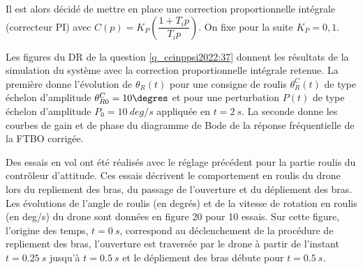 \ifprof
\begin{corrige}
\end{corrige}
\else
\fi

\ifprof
\begin{corrige}
\end{corrige}
\else
\fi

Il est alors décidé de mettre en place une correction proportionnelle intégrale (correcteur PI)
avec $C(p) = K_P\left(\dfrac{1+T_i p}{T_i p}\right)$. On fixe pour la suite $K_P = 0,1$.

\ifprof
\begin{corrige}
\end{corrige}
\else
\fi

Les figures du DR de la question \ref{q_ccinppsi2022:37} donnent les résultats de la simulation du système avec la
correction proportionnelle intégrale retenue. La première donne l’évolution de $\theta_R(t)$ pour une
consigne de roulis $\theta_R^C(t)$ de type échelon d’amplitude $\theta_{R0}^C = 10\degres$ et pour une perturbation $P(t)$ de
type échelon d’amplitude $P_0 =\SI{10}{deg/s}$ appliquée en $t = \SI{2}{s}$. La seconde donne les courbes
de gain et de phase du diagramme de Bode de la réponse fréquentielle de la FTBO corrigée.

\ifprof
\begin{corrige}
\end{corrige}
\else
\fi

Des essais en vol ont été réalisés avec le réglage précédent pour la partie roulis du contrôleur
d’attitude. Ces essais décrivent le comportement en roulis du drone lors du repliement des
bras, du passage de l’ouverture et du dépliement des bras. Les évolutions de l’angle de
roulis (en degrés) et de la vitesse de rotation en roulis (en \si{deg/s}) du drone sont données
en figure 20 pour 10 essais. Sur cette figure, l’origine des temps, $t = \SI{0}{s}$, correspond au
déclenchement de la procédure de repliement des bras, l’ouverture est traversée par le drone
à partir de l’instant $t = \SI{0,25}{s}$ jusqu’à $t = \SI{0,5}{s}$ et le dépliement des bras débute pour $t = \SI{0,5}{s}$.

